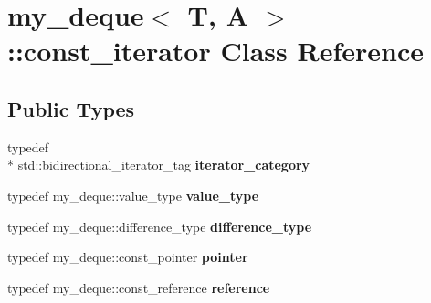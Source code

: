 \hypertarget{classmy__deque_1_1const__iterator}{\section{my\-\_\-deque$<$ T, A $>$\-:\-:const\-\_\-iterator Class Reference}
\label{classmy__deque_1_1const__iterator}
}
\subsection*{Public Types}
\begin{DoxyCompactItemize}
\item 
\hypertarget{classmy__deque_1_1const__iterator_a1a84b424e091e49a4af1c13a38621252}{typedef \\*
std\-::bidirectional\-\_\-iterator\-\_\-tag {\bfseries iterator\-\_\-category}}\label{classmy__deque_1_1const__iterator_a1a84b424e091e49a4af1c13a38621252}

\item 
\hypertarget{classmy__deque_1_1const__iterator_adc8d08cb0b0a1dcb50323ba5ab8fdecb}{typedef my\-\_\-deque\-::value\-\_\-type {\bfseries value\-\_\-type}}\label{classmy__deque_1_1const__iterator_adc8d08cb0b0a1dcb50323ba5ab8fdecb}

\item 
\hypertarget{classmy__deque_1_1const__iterator_abe3b655aa980c8a12ba486058464c91d}{typedef my\-\_\-deque\-::difference\-\_\-type {\bfseries difference\-\_\-type}}\label{classmy__deque_1_1const__iterator_abe3b655aa980c8a12ba486058464c91d}

\item 
\hypertarget{classmy__deque_1_1const__iterator_a6a7d42610f3b7e55f38897c151862071}{typedef my\-\_\-deque\-::const\-\_\-pointer {\bfseries pointer}}\label{classmy__deque_1_1const__iterator_a6a7d42610f3b7e55f38897c151862071}

\item 
\hypertarget{classmy__deque_1_1const__iterator_a37cd7eef8e73e5a65d7a9d16ba6d3ed2}{typedef my\-\_\-deque\-::const\-\_\-reference {\bfseries reference}}\label{classmy__deque_1_1const__iterator_a37cd7eef8e73e5a65d7a9d16ba6d3ed2}

\end{DoxyCompactItemize}

